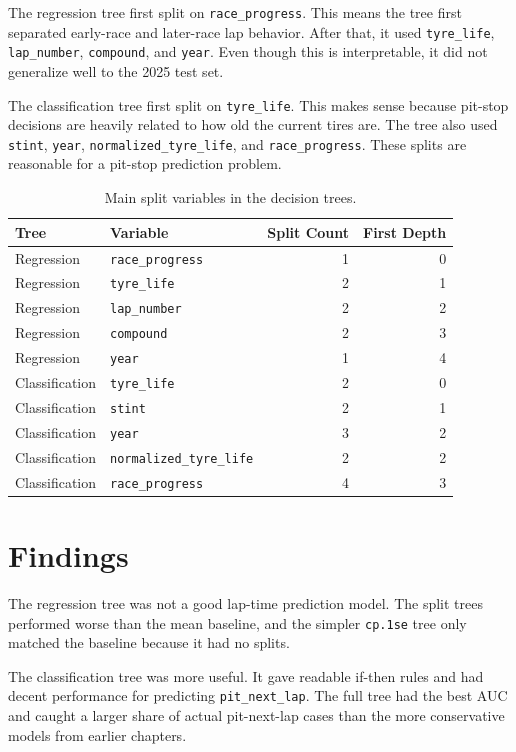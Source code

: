 \documentclass[11pt,oneside,openany]{book}
\begin{document}
The regression tree first split on \texttt{race\_progress}. This means the tree first separated early-race and later-race lap behavior. After that, it used \texttt{tyre\_life}, \texttt{lap\_number}, \texttt{compound}, and \texttt{year}. Even though this is interpretable, it did not generalize well to the 2025 test set.

The classification tree first split on \texttt{tyre\_life}. This makes sense because pit-stop decisions are heavily related to how old the current tires are. The tree also used \texttt{stint}, \texttt{year}, \texttt{normalized\_tyre\_life}, and \texttt{race\_progress}. These splits are reasonable for a pit-stop prediction problem.

\begin{table}[H]
\centering
\small
\caption{Main split variables in the decision trees.}
\begin{tabular}{llrr}
\toprule
Tree & Variable & Split Count & First Depth\\
\midrule
Regression & \texttt{race\_progress} & 1 & 0\\
Regression & \texttt{tyre\_life} & 2 & 1\\
Regression & \texttt{lap\_number} & 2 & 2\\
Regression & \texttt{compound} & 2 & 3\\
Regression & \texttt{year} & 1 & 4\\
Classification & \texttt{tyre\_life} & 2 & 0\\
Classification & \texttt{stint} & 2 & 1\\
Classification & \texttt{year} & 3 & 2\\
Classification & \texttt{normalized\_tyre\_life} & 2 & 2\\
Classification & \texttt{race\_progress} & 4 & 3\\
\bottomrule
\end{tabular}
\end{table}

\section{Findings}

The regression tree was not a good lap-time prediction model. The split trees performed worse than the mean baseline, and the simpler \texttt{cp.1se} tree only matched the baseline because it had no splits.

The classification tree was more useful. It gave readable if-then rules and had decent performance for predicting \texttt{pit\_next\_lap}. The full tree had the best AUC and caught a larger share of actual pit-next-lap cases than the more conservative models from earlier chapters.
\end{document}
